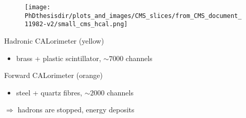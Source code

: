 \begin{frame}
\addtocounter{framenumber}{-1}
\transdissolve
\begin{minipage}[t]{.6\textwidth}
\begin{figure}
\texttt{[image: \\PhDthesisdir/plots\_and\_images/CMS\_slices/from\_CMS\_document\_11982-v2/small\_cms\_hcal.png]}
\end{figure}
\end{minipage}
\hfill\begin{minipage}[t]{.35\textwidth}
\begin{block}{Hadronic CALorimeter (yellow)}
\begin{itemize}
\item brass + plastic scintillator, $\sim\num{7000}$ channels
\end{itemize}
\end{block}

\begin{block}{Forward CALorimeter (orange)}
\begin{itemize}
\item steel + quartz fibres, $\sim\num{2000}$ channels
\end{itemize}
\end{block}

\begin{block}{}
$\Rightarrow$ hadrons are stopped, energy deposits
\end{block}
\end{minipage}
\end{frame}

